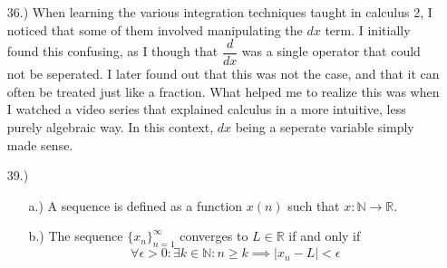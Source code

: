 \documentclass[12pt]{article}
\begin{document}
\begin{itemize}

    \item [36.)] When learning the various integration techniques taught in calculus 2, I noticed that some of them involved manipulating the $dx$ term. I initially found this confusing, as I though that $\dfrac{d}{dx}$ was a single operator that could not be seperated. I later found out that this was not the case, and that it can often be treated just like a fraction. What helped me to realize this was when I watched a video series that explained calculus in a more intuitive, less purely algebraic way. In this context, $dx$ being a seperate variable simply made sense.



    \item [39.)] \begin{itemize}
        \item [a.)] A sequence is defined as a function $x(n)$ such that $x:\mathbb{N}\rightarrow\mathbb{R}$.

        \item [b.)] The sequence $\{x_n\}^\infty_{n=1}$ converges to $L\in\mathbb{R}$ if and only if
        \[\forall\epsilon>0:\exists k\in\mathbb{N}:n\geq k\implies\vert x_n-L\vert<\epsilon\]
    \end{itemize}





\end{itemize}
\end{document}
